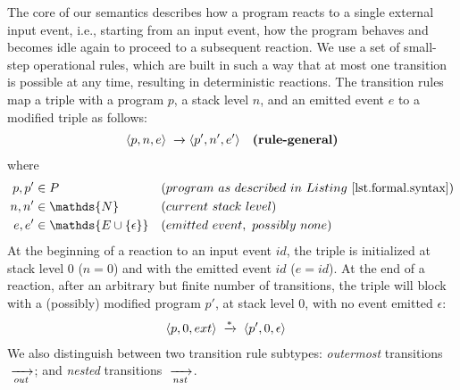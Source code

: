 The core of our semantics describes how a program reacts to a single external 
input event, i.e., starting from an input event, how the program behaves and 
becomes idle again to proceed to a subsequent reaction.
%
We use a set of small-step operational rules, which are built in such a way 
that at most one transition is possible at any time, resulting in deterministic 
reactions.
%
The transition rules map a triple with a program $p$, a stack level $n$, and an
emitted event $e$ to a modified triple as follows:
%
\begin{align*}
\langle p,  n,  e  \rangle &\;\xrightarrow{\;}
\langle p', n', e' \rangle
    & \textbf{(rule-general)}
\end{align*}
%
where
%
\begin{align*}
p, p' &\in P
    && (program~as~described~in~Listing~\ref{lst.formal.syntax})
\\
n, n' &\in \mathds{N}
    && (current~stack~level)
\\
e, e' &\in \mathds{E \cup \{\epsilon\}}
    && (emitted~event,~possibly~none)
\end{align*}
%
At the beginning of a reaction to an input event $id$, the triple is
initialized at stack level $0$ ($n=0$) and with the emitted event $id$
($e=id$).
At the end of a reaction, after an arbitrary but finite number of transitions,
the triple will block with a (possibly) modified program $p'$, at stack level
$0$, with no event emitted $\epsilon$:
%
\begin{align*}
\langle p,0,ext \rangle
    & \;\xrightarrow{*}\;
\langle p',0,\epsilon \rangle
\end{align*}
%
We also distinguish between two transition rule subtypes:
    \emph{outermost} transitions $\;\xrightarrow[out]{\;}$; and
    \emph{nested} transitions $\;\xrightarrow[nst]{\;}$.

